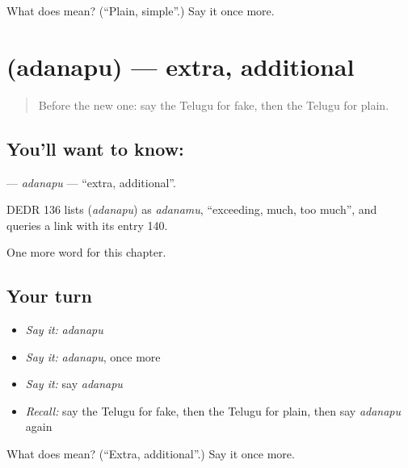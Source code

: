 \begin{tcolorbox}[breakable,colback=teal!4,colframe=teal!35!black,title={Before you move on}]
What does  mean? (\textquotedblleft{}Plain, simple\textquotedblright{}.) Say it once more.
\end{tcolorbox}
\section[\texorpdfstring{\te{అదనపు} (adanapu)}{అదనపు (adanapu)}]{ (adanapu) — extra, additional}

\label{lesson:TE-C182-adanapu}



\begin{quote}
Before the new one: say the Telugu for fake, then the Telugu for plain.
\end{quote}

\subsection*{You'll want to know: }
\textbf{} — \emph{adanapu} — \textquotedblleft{}extra, additional\textquotedblright{}.

\begin{cousinweb}
DEDR 136 lists \textbf{} (\emph{adanapu}) as \emph{adanamu}, \textquotedblleft{}exceeding, much, too much\textquotedblright{}, and queries a link with its entry 140.
\end{cousinweb}

\begin{grammarlens}[title={What you've built}]
One more word for this chapter.
\end{grammarlens}

\subsection*{Your turn}
\begin{itemize}
\raggedright
  \item \emph{Say it:} \emph{adanapu}
  \item \emph{Say it:} \emph{adanapu}, once more
  \item \emph{Say it:} say \emph{adanapu}
  \item \emph{Recall:} say the Telugu for fake, then the Telugu for plain, then say \emph{adanapu} again
\end{itemize}

\begin{tcolorbox}[breakable,colback=teal!4,colframe=teal!35!black,title={Before you move on}]
What does  mean? (\textquotedblleft{}Extra, additional\textquotedblright{}.) Say it once more.
\end{tcolorbox}
